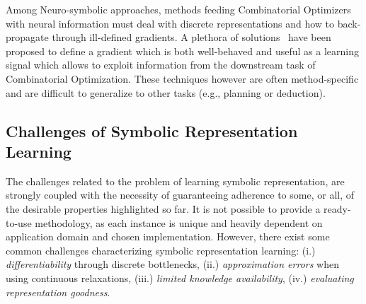 %
%
Among Neuro-symbolic approaches, methods feeding Combinatorial Optimizers with neural information must deal with discrete representations and how to back-propagate through ill-defined gradients.
A plethora of solutions~\cite{agrawal2019differentiable,poganvcic2020differentiation,fredrikson2023learning,wang2019satnet} have been proposed to define a gradient which is both well-behaved and useful as a learning signal which allows to exploit information from the downstream task of Combinatorial Optimization. These techniques however are often method-specific and are difficult to generalize to other tasks (e.g., planning or deduction).

\subsection{Challenges of Symbolic Representation Learning}
\label{nesy2023:sec:cl}
The challenges related to the problem of learning symbolic representation, are strongly coupled with the necessity of guaranteeing adherence to some, or all, of the desirable properties highlighted so far.
It is not possible to provide a ready-to-use methodology, as each instance is unique and heavily dependent on application domain and chosen implementation. However, there exist some common challenges characterizing symbolic representation learning: (i.) \textit{differentiability} through discrete bottlenecks, (ii.) \textit{approximation errors} when using continuous relaxations, (iii.) \textit{limited knowledge availability}, (iv.) \textit{evaluating representation goodness}.%

